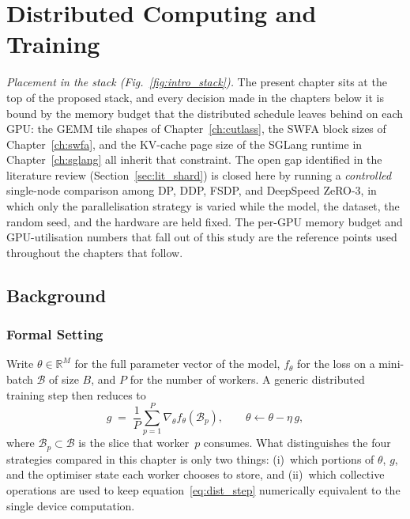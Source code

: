 \chapter{Distributed Computing and Training}\label{ch:distributed}

\emph{Placement in the stack (Fig.~\ref{fig:intro_stack}).} The
present chapter sits at the top of the proposed stack, and every
decision made in the chapters below it is bound by the memory
budget that the distributed schedule leaves behind on each GPU:
the GEMM tile shapes of Chapter~\ref{ch:cutlass}, the SWFA block
sizes of Chapter~\ref{ch:swfa}, and the KV-cache page size of
the SGLang runtime in Chapter~\ref{ch:sglang} all inherit that
constraint. The open gap identified in the literature review
(Section~\ref{sec:lit_shard}) is closed here by running a
\emph{controlled} single-node comparison among DP, DDP, FSDP, and
DeepSpeed ZeRO-3, in which only the parallelisation strategy is
varied while the model, the dataset, the random seed, and the
hardware are held fixed. The per-GPU memory budget and
GPU-utilisation numbers that fall out of this study are the
reference points used throughout the chapters that follow.

\section{Background}\label{sec:dist_bg}

\subsection{Formal Setting}\label{sec:dist_formal}
Write $\theta \in \mathbb{R}^M$ for the full parameter vector of
the model, $f_\theta$ for the loss on a mini-batch $\mathcal{B}$ of
size $B$, and $P$ for the number of workers. A generic distributed
training step then reduces to
\begin{equation}\label{eq:dist_step}
    g \;=\; \frac{1}{P} \sum_{p=1}^{P}
            \nabla_\theta f_\theta(\mathcal{B}_p),
    \qquad
    \theta \leftarrow \theta - \eta \,g,
\end{equation}
where $\mathcal{B}_p \subset \mathcal{B}$ is the slice that
worker~$p$ consumes. What distinguishes the four strategies
compared in this chapter is only two things: (i)~which portions of
$\theta$, $g$, and the optimiser state each worker chooses to
store, and (ii)~which collective operations are used to keep
equation~\eqref{eq:dist_step} numerically equivalent to the single
device computation.

